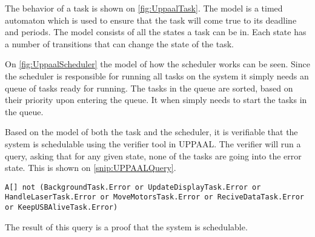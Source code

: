 The behavior of a task is shown on \autoref{fig:UppaalTask}.
The model is a timed automaton which is used to ensure that the task will come true to its deadline and periods. 
The model consists of all the states a task can be in.
Each state has a number of transitions that can change the state of the task. 


On \autoref{fig:UppaalScheduler} the model of how the scheduler works can be seen. 
Since the scheduler is responsible for running all tasks on the system it simply needs an queue of tasks ready for running. 
The tasks in the queue are sorted, based on their priority upon entering the queue.
It when simply needs to start the tasks in the queue.


Based on the model of both the task and the scheduler, it is verifiable that the system is schedulable using the verifier tool in UPPAAL. 
The verifier will run a query, asking that for any given state, none of the tasks are going into the error state. 
This is shown on \autoref{snip:UPPAALQuery}.
\begin{lstlisting}[label={snip:UPPAALQuery},caption={Query from UPPAAL verifier},frame=tlrb,numbers=none]
A[] not (BackgroundTask.Error or UpdateDisplayTask.Error or HandleLaserTask.Error or MoveMotorsTask.Error or ReciveDataTask.Error or KeepUSBAliveTask.Error)
\end{lstlisting}
The result of this query is a proof that the system is schedulable. 
